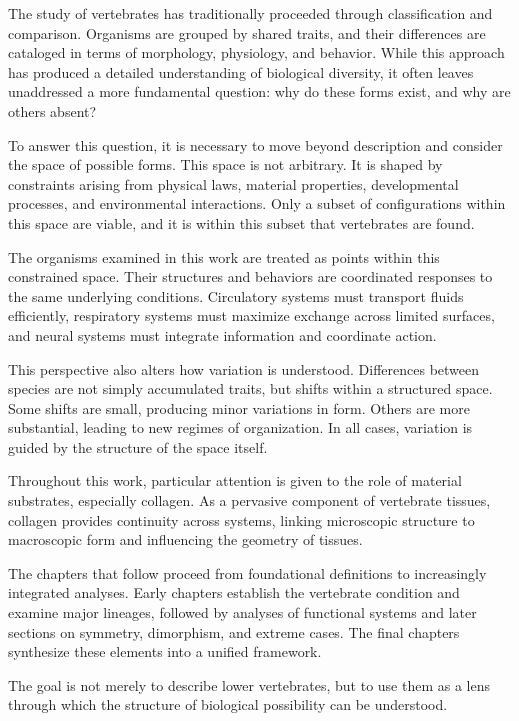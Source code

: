 \documentclass[11pt,oneside]{book}
\begin{document}
The study of vertebrates has traditionally proceeded through classification and comparison. Organisms are grouped by shared traits, and their differences are cataloged in terms of morphology, physiology, and behavior. While this approach has produced a detailed understanding of biological diversity, it often leaves unaddressed a more fundamental question: why do these forms exist, and why are others absent?

To answer this question, it is necessary to move beyond description and consider the space of possible forms. This space is not arbitrary. It is shaped by constraints arising from physical laws, material properties, developmental processes, and environmental interactions. Only a subset of configurations within this space are viable, and it is within this subset that vertebrates are found.

The organisms examined in this work are treated as points within this constrained space. Their structures and behaviors are coordinated responses to the same underlying conditions. Circulatory systems must transport fluids efficiently, respiratory systems must maximize exchange across limited surfaces, and neural systems must integrate information and coordinate action.

This perspective also alters how variation is understood. Differences between species are not simply accumulated traits, but shifts within a structured space. Some shifts are small, producing minor variations in form. Others are more substantial, leading to new regimes of organization. In all cases, variation is guided by the structure of the space itself.

Throughout this work, particular attention is given to the role of material substrates, especially collagen. As a pervasive component of vertebrate tissues, collagen provides continuity across systems, linking microscopic structure to macroscopic form and influencing the geometry of tissues.

The chapters that follow proceed from foundational definitions to increasingly integrated analyses. Early chapters establish the vertebrate condition and examine major lineages, followed by analyses of functional systems and later sections on symmetry, dimorphism, and extreme cases. The final chapters synthesize these elements into a unified framework.

The goal is not merely to describe lower vertebrates, but to use them as a lens through which the structure of biological possibility can be understood.
\end{document}
